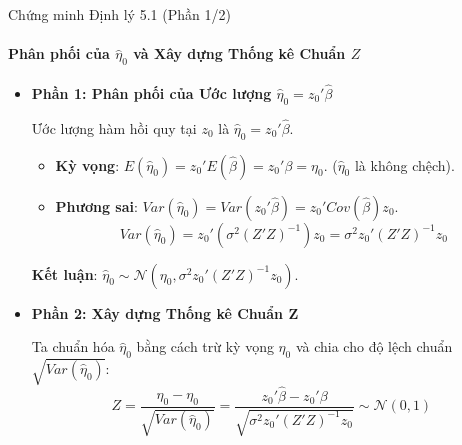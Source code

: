 \begin{frame}{Chứng minh Định lý 5.1 (Phần 1/2)}
    \framesubtitle{Phân phối của $\hat{\eta}_0$ và Xây dựng Thống kê Chuẩn $Z$}

    \begin{itemize}
        \item \textbf{Phần 1: Phân phối của Ước lượng $\hat{\eta}_0 = z_0'\hat{\beta}$}
        
        Ước lượng hàm hồi quy tại $z_0$ là $\hat{\eta}_0 = z_0'\hat{\beta}$.
        \begin{itemize}
            \item \textbf{Kỳ vọng}: $E(\hat{\eta}_0) = z_0'E(\hat{\beta}) = z_0'\beta = \eta_0$.
            ($\hat{\eta}_0$ là không chệch).
            \item \textbf{Phương sai}: $Var(\hat{\eta}_0) = Var(z_0'\hat{\beta}) = z_0' Cov(\hat{\beta}) z_0$.
            \[
                Var(\hat{\eta}_0) = z_0' (\sigma^2 (Z'Z)^{-1}) z_0 = \sigma^2 z_0'(Z'Z)^{-1}z_0
            \]
        \end{itemize}
        \textbf{Kết luận}: $\hat{\eta}_0 \sim \mathcal{N}(\eta_0, \sigma^2 z_0'(Z'Z)^{-1}z_0)$.
        \item \textbf{Phần 2: Xây dựng Thống kê Chuẩn Z}
        
        Ta chuẩn hóa $\hat{\eta}_0$ bằng cách trừ kỳ vọng $\eta_0$ và chia cho độ lệch chuẩn $\sqrt{Var(\hat{\eta}_0)}$:
        \[
            Z = \frac{\hat{\eta}_0 - \eta_0}{\sqrt{Var(\hat{\eta}_0)}} = \frac{z_0'\hat{\beta} - z_0'\beta}{\sqrt{\sigma^2 z_0'(Z'Z)^{-1}z_0}} \sim \mathcal{N}(0, 1)
        \]
    \end{itemize}
\end{frame}
